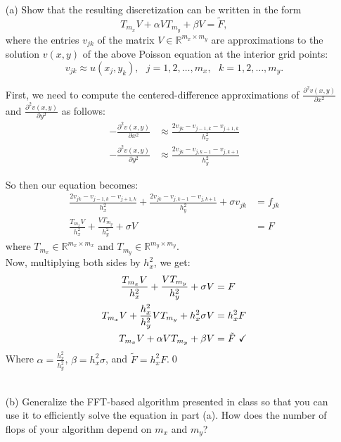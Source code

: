 \documentclass[12pt]{article}
\def\R{\mathbb{R}}
\begin{document}
\begin{itemize}

\item[(a)] Show that the resulting discretization can be written in the form
$$T_{m_x}V + \alpha VT_{m_y} + \beta V = \tilde{F},$$
where the entries $v_{jk}$ of the matrix $V \in \R^{m_x \times m_y}$ are approximations to the solution $v(x,y)$ of the above Poisson equation at the interior grid points:
$$v_{jk} \approx u(x_j,y_k), \text{ } j=1,2,\dots,m_x, \text{ } k=1,2,\dots,m_y.$$

First, we need to compute the centered-difference approximations of $\frac{\partial^2v(x,y)}{\partial x^2}$ and $\frac{\partial^2 v(x,y)}{\partial y^2}$ as follows:
\begin{align}
-\frac{\partial^2v(x,y)}{\partial x^2} &\approx \frac{2v_{jk} - v_{j-1,k} - v_{j+1,k}}{h_x^2} \nonumber \\
-\frac{\partial^2 v(x,y)}{\partial y^2} &\approx \frac{2v_{jk} - v_{j,k-1} - v_{j,k+1}}{h_y^2} \nonumber 
\end{align}

So then our equation becomes:
\begin{align}
\frac{2v_{jk} - v_{j-1,k} - v_{j+1,k}}{h_x^2} + \frac{2v_{jk} - v_{j,k-1} - v_{j,k+1}}{h_y^2} +\sigma v_{jk} &= f_{jk} \nonumber \\
\frac{T_{m_x}V}{h_x^2} + \frac{VT_{m_y}}{h_y^2} + \sigma V &= F \nonumber 
\end{align}
where $T_{m_x} \in \R^{m_x \times m_x}$ and $T_{m_y} \in \R^{m_y \times m_y}$.\\

Now, multiplying both sides by $h_x^2$, we get:
\begin{align}
\frac{T_{m_x}V}{h_x^2} + \frac{VT_{m_y}}{h_y^2} + \sigma V &= F \nonumber \\
T_{m_x}V + \frac{h_x^2}{h_y^2}VT_{m_y} + h_x^2\sigma V &= h_x^2 F \nonumber \\
T_{m_x}V + \alpha VT_{m_y} + \beta V &= \tilde{F} \text{ \checkmark}\nonumber
\end{align}
Where $\alpha = \frac{h_x^2}{h_y^2}$, $\beta = h_x^2\sigma$, and $\tilde{F} = h_x^2F$.\qed\\\\


\item[(b)] Generalize the FFT-based algorithm presented in class so that you can use it to efficiently solve the equation in part (a).  How does the number of flops of your algorithm depend on $m_x$ and $m_y$?\\


\end{itemize}
\end{document}
